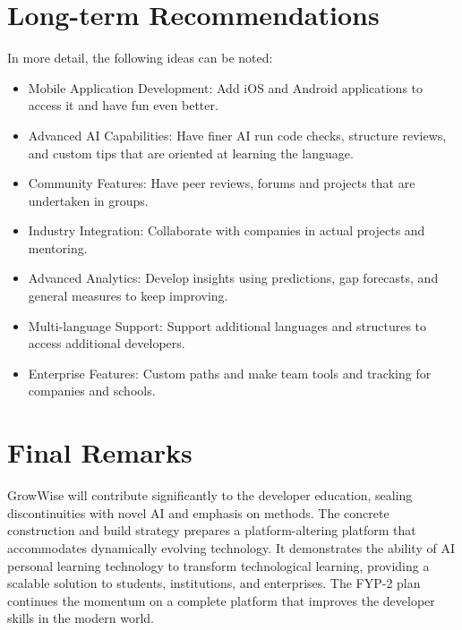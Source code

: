 \documentclass{FastFyp}
\begin{document}
\section{Long-term Recommendations}
In more detail, the following ideas can be noted:
\begin{itemize}
\item Mobile Application Development: Add iOS and Android applications to access it and have fun even better.
\item Advanced AI Capabilities: Have finer AI run code checks, structure reviews, and custom tips that are oriented at learning the language.
\item Community Features: Have peer reviews, forums and projects that are undertaken in groups.
\item Industry Integration: Collaborate with companies in actual projects and mentoring.
\item Advanced Analytics: Develop insights using predictions, gap forecasts, and general measures to keep improving.
\item Multi-language Support: Support additional languages and structures to access additional developers.
\item Enterprise Features: Custom paths and make team tools and tracking for companies and schools.
\end{itemize}
\section{Final Remarks}
GrowWise will contribute significantly to the developer education, sealing discontinuities with novel AI and emphasis on methods. The concrete construction and build strategy prepares a platform-altering platform that accommodates dynamically evolving technology. It demonstrates the ability of AI personal learning technology to transform technological learning, providing a scalable solution to students, institutions, and enterprises. The FYP-2 plan continues the momentum on a complete platform that improves the developer skills in the modern world.

\renewcommand{\bibname}{References}
\cleardoublepage
{}



\appendix
\end{document}
